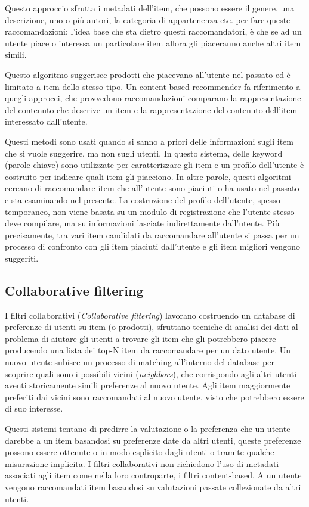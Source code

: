 Questo approccio sfrutta i metadati dell'item, che possono essere il genere, una descrizione, uno o più autori, la categoria di 
appartenenza etc. per fare queste raccomandazioni; l'idea base che sta dietro questi raccomandatori, è che se ad un utente piace 
o interessa un particolare item allora gli piaceranno anche altri item simili.

Questo algoritmo suggerisce prodotti che piacevano all'utente nel passato ed è limitato a item dello stesso tipo. Un 
content-based recommender fa riferimento a quegli approcci, che provvedono raccomandazioni comparano la rappresentazione del
contenuto che descrive un item e la rappresentazione del contenuto dell'item interessato dall'utente. 

Questi metodi sono usati quando si sanno a priori delle informazioni sugli item che si vuole suggerire, ma non sugli utenti.
In questo sistema, delle keyword (parole chiave) sono utilizzate per caratterizzare gli item e un profilo dell'utente è 
costruito per indicare quali item gli piacciono. In altre parole, questi algoritmi cercano di raccomandare item che 
all'utente sono piaciuti o ha usato nel passato e sta esaminando nel presente. La costruzione del profilo dell'utente,
spesso temporaneo, non viene basata su un modulo di registrazione che l'utente stesso deve compilare, ma su informazioni
lasciate indirettamente dall'utente. Più precisamente, tra vari item candidati da raccomandare all'utente si passa per un 
processo di confronto con gli item piaciuti dall'utente e gli item migliori vengono suggeriti.


\subsection{Collaborative filtering}
I filtri collaborativi (\textit{Collaborative filtering}) lavorano costruendo un database di preferenze di utenti su item (o prodotti),
sfruttano tecniche di analisi dei dati al problema di aiutare gli utenti a trovare gli item che gli potrebbero piacere producendo una lista
dei top-N item da raccomandare per un dato utente.
Un nuovo utente subisce un processo di matching all'interno del database per scoprire quali sono i possibili vicini (\textit{neighbors}),
che corrispondo agli altri utenti aventi storicamente simili preferenze al nuovo utente. Agli item maggiormente preferiti dai vicini sono
raccomandati al nuovo utente, visto che potrebbero essere di suo interesse. 

Questi sistemi tentano di predirre la valutazione o la preferenza che un utente darebbe a un item basandosi su preferenze date da altri utenti, 
queste preferenze possono essere ottenute o in modo esplicito dagli utenti o tramite qualche misurazione implicita. 
I filtri collaborativi non richiedono l'uso di metadati associati agli item come nella loro controparte, i filtri content-based. A un utente 
vengono raccomandati item basandosi su valutazioni passate collezionate da altri utenti.

